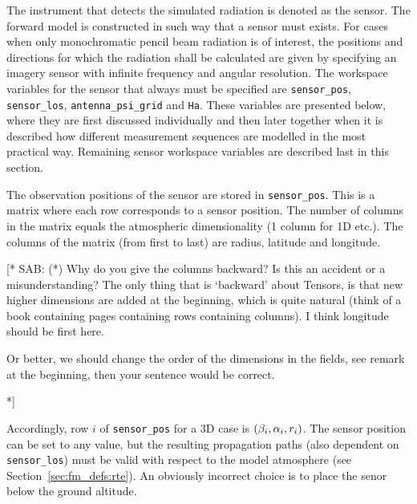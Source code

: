 \label{sec:fm_defs:sensor}

The instrument that detects the simulated radiation is denoted as the
sensor. The forward model is constructed in such
way that a sensor must exists. For cases when only monochromatic
pencil beam radiation is of interest, the positions and directions for
which the radiation shall be calculated are given by specifying an
imagery sensor with infinite frequency and angular resolution. The
workspace variables for the sensor that always must be specified are
\verb|sensor_pos|, \verb|sensor_los|, \verb|antenna_psi_grid| and
\verb|Ha|. These variables are presented below, where they are first
discussed individually and then later together when it is described
how different measurement sequences are modelled in the most practical
way. Remaining sensor workspace variables are described last in this
section.


\label{sec:fm_defs:sensorpos}

The observation positions of the sensor are stored in
\verb|sensor_pos|. This is a matrix where each row corresponds to a
sensor position. The number of columns in the matrix equals the
atmospheric dimensionality (1 column for 1D etc.). The columns of the
matrix (from first to last) are radius, latitude and longitude. 

[*
SAB: (*) Why do you give the columns backward? Is this an accident or a
misunderstanding? The only thing that is `backward' about Tensors, is
that new higher dimensions are added at the beginning, which is quite
natural (think of a book containing pages containing rows containing
columns). I think longitude should be first here. 

Or better, we should change the order of the dimensions in the fields,
see remark at the beginning, then your sentence would be correct.

*]



Accordingly, row $i$ of \verb|sensor_pos| for a 3D case is
$(\beta_{i},\alpha_{i},r_{i})$. The sensor position can be set to any
value, but the resulting propagation paths (also dependent on
\verb|sensor_los|) must be valid with respect to the model atmosphere
(see Section~\ref{sec:fm_defs:rte}). An obviously incorrect choice is to
place the senor below the ground altitude.

